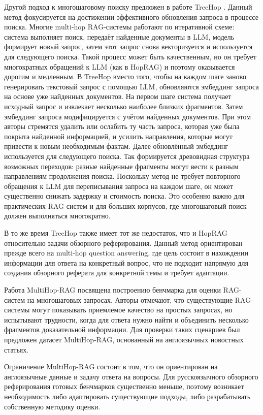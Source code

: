 \documentclass[oneside,senior,etd]{BYUPhys}
\begin{document}
Другой подход к многошаговому поиску предложен в работе TreeHop \cite{li2025treehop}. 
Данный метод фокусируется на достижении эффективного обновления запроса в процессе поиска. 
Многие multi-hop RAG-системы работают по итеративной схеме: система выполняет поиск, передаёт найденные документы в LLM, 
модель формирует новый запрос, затем этот запрос снова векторизуется и используется для следующего поиска. 
Такой процесс может быть качественным, но он требует многократных обращений к LLM (как в HopRAG) и поэтому оказывается дорогим и медленным.
В TreeHop вместо того, чтобы на каждом шаге заново генерировать текстовый запрос с помощью LLM, обновляются эмбеддинг запроса на основе уже найденных документов. 
На первом шаге система получает исходный запрос и извлекает несколько наиболее близких фрагментов. 
Затем эмбеддинг запроса модифицируется с учётом найденных документов. 
При этом авторы стремятся удалить или ослабить ту часть запроса, которая уже была покрыта найденной информацией, и усилить направления, которые могут привести к новым необходимым фактам. 
Далее обновлённый эмбеддинг используется для следующего поиска. 
Так формируется древовидная структура возможных переходов: разные найденные фрагменты могут вести к разным направлениям продолжения поиска.
Поскольку метод не требует повторного обращения к LLM для переписывания запроса на каждом шаге, он может существенно снижать задержку и стоимость поиска. 
Это особенно важно для практических RAG-систем и для больших корпусов, где многошаговый поиск должен выполняться многократно.

В то же время TreeHop также имеет тот же недостаток, что и HopRAG относительно задачи обзорного реферирования. 
Данный метод ориентирован прежде всего на multi-hop question answering, где цель состоит в нахождении информации для ответа на конкретный вопрос,
что не подходит напрямую для создания обзорного реферата для конкретной темы и требует адаптации.

Работа MultiHop-RAG \cite{tang2024multihoprag} посвящена построению бенчмарка для оценки RAG-систем на многошаговых запросах. 
Авторы отмечают, что существующие RAG-системы могут показывать приемлемое качество на простых запросах, но испытывают трудности, 
когда для ответа нужно найти и объединить несколько фрагментов доказательной информации. 
Для проверки таких сценариев был предложен датасет MultiHop-RAG, основанный на англоязычных новостных статьях.

Ограничение MultiHop-RAG состоит в том, что он ориентирован на англоязычные данные и задачу ответа на вопросы. 
Для русскоязычного обзорного реферирования готовых бенчмарков существенно меньше, 
поэтому возникает необходимость либо адаптировать существующие подходы, либо разрабатывать собственную методику оценки.
\end{document}
